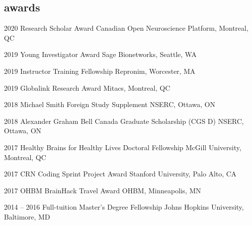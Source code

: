 \documentclass[]{friggeri-cv} %
\begin{document}
\subsection{awards}
\begin{entrylist}
\vspace{-7pt}

\entry
{2020}
{Research Scholar Award}
{Canadian Open Neuroscience Platform, Montreal, QC}
{}
\vspace{-7pt}

\entry
{2019}
{Young Investigator Award}
{Sage Bionetworks, Seattle, WA}
{}
\vspace{-7pt}

\entry
{2019}
{Instructor Training Fellowship}
{Repronim, Worcester, MA}
{}
\vspace{-7pt}

\entry
{2019}
{Globalink Research Award}
{Mitacs, Montreal, QC}
{}
\vspace{-7pt}

\entry
{2018}
{Michael Smith Foreign Study Supplement}
{NSERC, Ottawa, ON}
{}
\vspace{-7pt}

\entry
{2018}
{Alexander Graham Bell Canada Graduate Scholarship (CGS D)}
{NSERC, Ottawa, ON}
{}
\vspace{-7pt}


\entry
{2017}
{Healthy Brains for Healthy Lives Doctoral Fellowship}
{McGill University, Montreal, QC}
{}
\vspace{-7pt}

\entry
{2017}
{CRN Coding Sprint Project Award}
{Stanford University, Palo Alto, CA}
{}
\vspace{-7pt}

\entry
{2017}
{OHBM BrainHack Travel Award}
{OHBM, Minneapolis, MN}
{}
\vspace{-7pt}

\entry
{2014 -- 2016}
{Full-tuition Master's Degree Fellowship}
{Johns Hopkins University, Baltimore, MD}
{}
\vspace{-7pt}


\end{entrylist}
\end{document}
